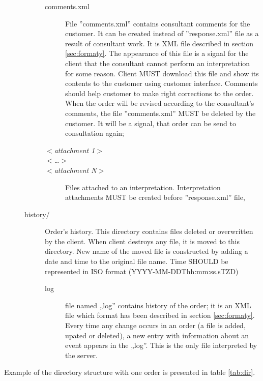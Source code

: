 \documentclass[a4paper]{article}
\begin{document}
\begin{description}
\begin{description}
\begin{description}
			\item[comments.xml] File ''comments.xml'' contains consultant comments for the customer. 
			It can be created instead of ''response.xml'' file as a result of consultant work. 
			It is XML file described in section \ref{sec:formaty}. The appearance of this file 
			is a signal for the client that the consultant cannot perform an interpretation 
			for some reason. Client MUST download this 
			file and show its contents to the
			customer using customer interface. Comments should help customer to make right
			corrections to the order. When the order will be revised according to the 
			consultant's comments, the file ''comments.xml'' MUST be deleted by the customer.
			It will be a signal, that order can be send to consultation again;
			\item[$<$\textit{attachment 1}$>$]   
			\item[$<$\textit{\ldots}$>$]   
			\item[$<$\textit{attachment N}$>$] Files attached to an interpretation. 
			Interpretation attachments MUST be created before ''response.xml'' file,
			\end{description}
		\item[history/] Order's history. This directory contains files deleted or
		overwritten by the client. When client destroys any file, it is moved to this
		directory. New name of the moved file is constructed by adding a date and time to
		the original file name. Time SHOULD be represented in ISO format 
		(YYYY-MM-DDThh:mm:ss.sTZD)
			\begin{description}
  			\item[log] file named „log” contains history of the order; it is an XML file 
			which format has been described in section \ref{sec:formaty}. Every time any 
			change occurs in an order (a file is added, upated or deleted), a new entry with 
			information about an event appears in the „log”. This is the only file interpreted 
			by the server. 
			\end{description}
		\end{description}
\end{description}

Example of the directory structure with one order is presented in table \ref{tab:dir}.
\end{document}
